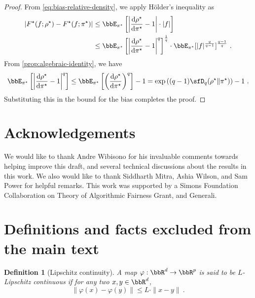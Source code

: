 \documentclass[11pt]{article}
\newtheorem{definition}{Definition}[section]
\newcounter{ct}
\newcommand{\rmd}{\mathrm{d}}
\begin{document}
\begin{proof}
From \cref{eq:bias-relative-density}, we apply H\"{o}lder's inequality as
\begin{align*}
    \left|F^{\star}(f; \rho^{\star}) - F^{\star}(f; \pi^{\star})\right| &\leq \bbE_{\pi^{\star}}\left[\left|\frac{\rmd \rho^{\star}}{\rmd \pi^{\star}} - 1\right| \cdot |f|\right] \\
    &\leq \bbE_{\pi^{\star}}\left[\left|\frac{\rmd \rho^{\star}}{\rmd \pi^{\star}} - 1\right|^{q}\right]^{\frac{1}{q}} \cdot \bbE_{\pi^{\star}}[|f|^{\frac{q}{q - 1}}]^{\frac{q - 1}{q}}~.
\end{align*}
From \cref{prop:algebraic-identity}, we have
\begin{equation*}
    \bbE_{\pi^{\star}}\left[\left|\frac{\rmd \rho^{\star}}{\rmd \pi^{\star}} - 1\right|^{q}\right] \leq \bbE_{\pi^{\star}}\left[\left(\frac{\rmd \rho^{\star}}{\rmd \pi^{\star}}\right)^{q}\right] - 1 = \exp\left((q - 1) \sfD_{q}(\rho^{\star} \| \pi^{\star})\right) - 1~.
\end{equation*}
Substituting this in the bound for the bias completes the proof.
\end{proof}

\section*{Acknowledgements}

We would like to thank Andre Wibisono for his invaluable comments towards helping improve this draft, and several technical discussions about the results in this work.
We also would like to thank Siddharth Mitra, Ashia Wilson, and Sam Power for helpful remarks.
This work was supported by a Simons Foundation Collaboration on Theory of Algorithmic Fairness Grant, and Generali.




\appendix
\section{Definitions and facts excluded from the main text}
\label{app:sec:defs}

\begin{definition}[Lipschitz continuity]
A map \(\varphi : \bbR^{d} \to \bbR^{p}\) is said to be \emph{\(L\)-Lipschitz continuous} if for any two \(x, y \in \bbR^{d}\),
\begin{equation*}
    \|\varphi(x) - \varphi(y)\| \leq L \cdot \|x - y\|~.
\end{equation*}
\end{definition}
\end{document}
